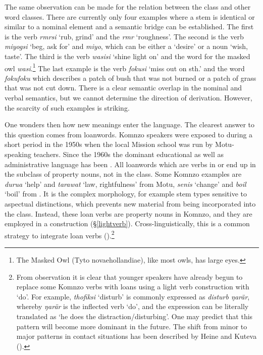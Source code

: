 The same observation can be made for the relation between the  class and other word classes. There are currently only four examples where a  stem is identical or similar to a nominal element and a semantic bridge can be established. The first is the verb \emph{rmrsi} `rub, grind' and the  \emph{rmr} `roughness'. The second is the verb \emph{miyogsi} `beg, ask for' and \emph{miyo}, which can be either a  `desire' or a noun `wish, taste'. The third is the verb \emph{wasisi} `shine light on' and the word for the masked owl \emph{wasi}.\footnote{The Masked Owl (Tyto novaehollandiae), like most owls, has large eyes.} The last example is the verb \emph{fokusi} `miss out on sth.' and the word \emph{fokufoku} which describes a patch of bush that was not burned or a patch of grass that was not cut down. There is a clear semantic overlap in the nominal and verbal semantics, but we cannot determine the direction of derivation. However, the scarcity of such examples is striking.

\newpage 
One wonders then how new  meanings enter the language. The clearest answer to this question comes from loanwords. Komnzo speakers were exposed to  during a short period in the 1950s when the local Mission school was run by Motu-speaking teachers. Since the 1960s the dominant educational as well as administrative language has been . All loanwords which are verbs in  or  end up in the  subclass of property nouns, not in the  class. Some Komnzo examples are \emph{durua} `help' and \emph{tarawat} `law, rightfulness' from Motu, \emph{senis} `change' and \emph{boil} `boil' from . It is the complex  morphology, for example stem types sensitive to aspectual distinctions, which prevents new material from being incorporated into the  class. Instead, these loan verbs are property nouns in Komnzo, and they are employed in a  construction ({\S}\ref{lightverb}). Cross-linguistically, this is a common strategy to integrate loan verbs (\citealt{Wichmann:2008loanverbs}).\footnote{From observation it is clear that younger speakers have already begun to replace some Komnzo verbs with  loans using a light verb construction with `do'. For example, \emph{thofiksi} `disturb' is commonly expressed as \emph{disturb ŋarär}, whereby \emph{ŋarär} is the inflected verb `do', and the expression can be literally translated as `he does the distraction/disturbing'. One may predict that this pattern will become more dominant in the future. The shift from minor to major patterns in contact situations has been described by Heine and Kuteva (\citeyear[44]{Heine:2005wp}).}


